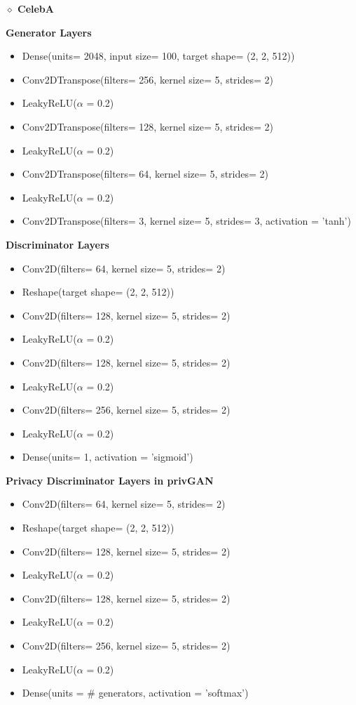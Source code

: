 \textbf{$\diamond$ CelebA}




\textbf{Generator Layers}
\begin{itemize}

\item Dense(units= 2048, input size= 100, target shape=
(2, 2, 512))
\item Conv2DTranspose(filters= 256, kernel size= 5,
strides= 2)
\item LeakyReLU($\alpha$ = 0.2)
\item  Conv2DTranspose(filters= 128, kernel size= 5,
strides= 2)
\item LeakyReLU($\alpha$ = 0.2)
\item Conv2DTranspose(filters= 64, kernel size= 5,
strides= 2)
\item LeakyReLU($\alpha$ = 0.2)
\item Conv2DTranspose(filters= 3, kernel size= 5, strides=
3, activation = ’tanh’)
\end{itemize}

\textbf{Discriminator Layers}
\begin{itemize}

\item Conv2D(filters= 64, kernel size= 5, strides= 2)
\item Reshape(target shape= (2, 2, 512))
\item Conv2D(filters= 128, kernel size= 5, strides= 2)
\item LeakyReLU($\alpha$ = 0.2)
\item Conv2D(filters= 128, kernel size= 5, strides= 2)
\item LeakyReLU($\alpha$ = 0.2)
\item Conv2D(filters= 256, kernel size= 5, strides= 2)
\item LeakyReLU($\alpha$ = 0.2)
\item Dense(units= 1, activation = ’sigmoid’)
\end{itemize}

\textbf{Privacy Discriminator Layers in privGAN}
\begin{itemize}

\item Conv2D(filters= 64, kernel size= 5, strides= 2)
\item Reshape(target shape= (2, 2, 512))
\item Conv2D(filters= 128, kernel size= 5, strides= 2)
\item LeakyReLU($\alpha$ = 0.2)
\item Conv2D(filters= 128, kernel size= 5, strides= 2)
\item LeakyReLU($\alpha$ = 0.2)
\item Conv2D(filters= 256, kernel size= 5, strides= 2)
\item LeakyReLU($\alpha$ = 0.2)
\item Dense(units = \# generators, activation =
’softmax’)

\end{itemize}




